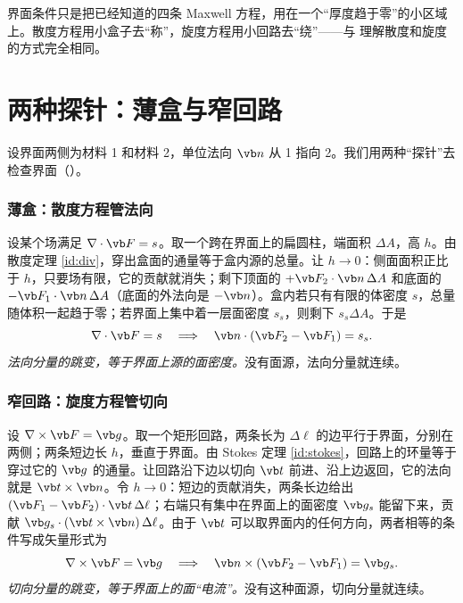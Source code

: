 \begin{intuition}[界面条件不是新定律]
界面条件只是把已经知道的四条 Maxwell 方程，用在一个“厚度趋于零”的小区域上。散度方程用小盒子去“称”，旋度方程用小回路去“绕”——与 理解散度和旋度的方式完全相同。
\end{intuition}

\section{两种探针：薄盒与窄回路}\label{sec:interfaces-probes}

设界面两侧为材料 1 和材料 2，单位法向 $\vb n$ 从 1 指向 2。我们用两种“探针”去检查界面（）。


\subsubsection{薄盒：散度方程管法向} 设某个场满足 $\nabla\cdot\vb F=s$。取一个跨在界面上的扁圆柱，端面积 $\Delta A$，高 $h$。由散度定理 \eqref{id:div}，穿出盒面的通量等于盒内源的总量。让 $h\to0$：侧面面积正比于 $h$，只要场有限，它的贡献就消失；剩下顶面的 $+\vb F_2\cdot\vb n\,\Delta A$ 和底面的 $-\vb F_1\cdot\vb n\,\Delta A$（底面的外法向是 $-\vb n$）。盒内若只有有限的体密度 $s$，总量随体积一起趋于零；若界面上集中着一层面密度 $s_s$，则剩下 $s_s\Delta A$。于是
\begin{equation}
\nabla\cdot\vb F=s\quad\Longrightarrow\quad \vb n\cdot(\vb F_2-\vb F_1)=s_s .
\label{eq:probe-div}
\end{equation}
\emph{法向分量的跳变，等于界面上源的面密度。}没有面源，法向分量就连续。

\subsubsection{窄回路：旋度方程管切向} 设 $\nabla\times\vb F=\vb g$。取一个矩形回路，两条长为 $\Delta\ell$ 的边平行于界面，分别在两侧；两条短边长 $h$，垂直于界面。由 Stokes 定理 \eqref{id:stokes}，回路上的环量等于穿过它的 $\vb g$ 的通量。让回路沿下边以切向 $\vb t$ 前进、沿上边返回，它的法向就是 $\vb t\times\vb n$。令 $h\to0$：短边的贡献消失，两条长边给出 $(\vb F_1-\vb F_2)\cdot\vb t\,\Delta\ell$；右端只有集中在界面上的面密度 $\vb g_s$ 能留下来，贡献 $\vb g_s\cdot(\vb t\times\vb n)\,\Delta\ell$。由于 $\vb t$ 可以取界面内的任何方向，两者相等的条件写成矢量形式为
\begin{equation}
\nabla\times\vb F=\vb g\quad\Longrightarrow\quad \vb n\times(\vb F_2-\vb F_1)=\vb g_s .
\label{eq:probe-curl}
\end{equation}
\emph{切向分量的跳变，等于界面上的面“电流”。}没有这种面源，切向分量就连续。

